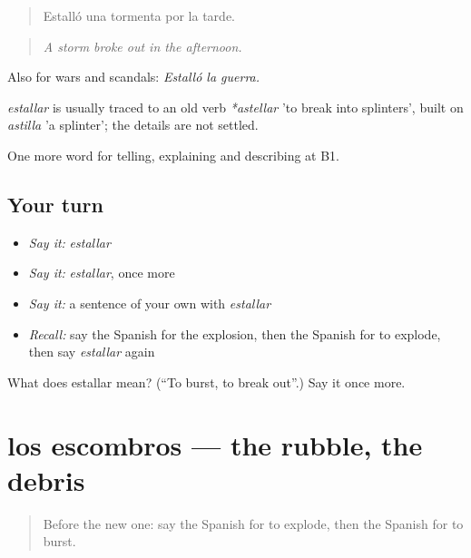 \begin{quote}
Estalló una tormenta por la tarde.
\end{quote}

\begin{quote}
\emph{A storm broke out in the afternoon.}
\end{quote}

Also for wars and scandals: \emph{Estalló la guerra.}

\begin{cousinweb}
\emph{estallar} is usually traced to an old verb \emph{*astellar} 'to break into splinters', built on \emph{astilla} 'a splinter'; the details are not settled.
\end{cousinweb}

\begin{grammarlens}[title={What you've built}]
One more word for telling, explaining and describing at B1.
\end{grammarlens}

\subsection*{Your turn}
\begin{itemize}
\raggedright
  \item \emph{Say it:} \emph{estallar}
  \item \emph{Say it:} \emph{estallar}, once more
  \item \emph{Say it:} a sentence of your own with \emph{estallar}
  \item \emph{Recall:} say the Spanish for the explosion, then the Spanish for to explode, then say \emph{estallar} again
\end{itemize}

\begin{tcolorbox}[breakable,colback=teal!4,colframe=teal!35!black,title={Before you move on}]
What does estallar mean? (\textquotedblleft{}To burst, to break out\textquotedblright{}.) Say it once more.
\end{tcolorbox}
\section[los escombros]{los escombros — the rubble, the debris}

\label{lesson:ES-C529-escombros}



\begin{quote}
Before the new one: say the Spanish for to explode, then the Spanish for to burst.
\end{quote}

